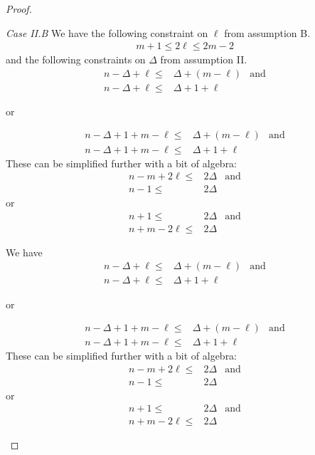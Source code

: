 \begin{proof}
\begin{description}
  \textit{Case II.B}  We have the following constraint on $\ell$ from
  assumption B.
  \begin{align*}
   m + 1 \leq 2 \ell \leq 2m - 2
  \end{align*}
  and the following constraints on $\Delta$ from assumption II.
  \begin{align*}
   n - \Delta + \ell \leq & \Delta + (m - \ell) & \text{and} \\
   n - \Delta + \ell \leq & \Delta + 1 + \ell
  \end{align*}
  \begin{center}or\end{center}
  \begin{align*}
   n - \Delta + 1 + m - \ell \leq & \Delta + (m - \ell) & \text{and} \\
   n - \Delta + 1 + m - \ell \leq & \Delta + 1 + \ell
  \end{align*}
  These can be simplified further with a bit of algebra:
  \begin{align*}
   n-m+2\ell \leq & 2 \Delta & \text{and} \\
   n-1 \leq       & 2\Delta
  \end{align*}
  or
  \begin{align*}
   n+1 \leq        & 2 \Delta & \text{and} \\
   n+m-2\ell  \leq & 2 \Delta
  \end{align*}

  We have
  \begin{align*}
   n - \Delta + \ell \leq & \Delta + (m - \ell) & \text{and} \\
   n - \Delta + \ell \leq & \Delta + 1 + \ell
  \end{align*}
  \begin{center}or\end{center}
  \begin{align*}
   n - \Delta + 1 + m - \ell \leq & \Delta + (m - \ell) & \text{and} \\
   n - \Delta + 1 + m - \ell \leq & \Delta + 1 + \ell
  \end{align*}
  These can be simplified further with a bit of algebra:
  \begin{align*}
   n-m+2\ell \leq & 2 \Delta & \text{and} \\
   n-1 \leq       & 2\Delta
  \end{align*}
  or
  \begin{align*}
   n+1 \leq        & 2 \Delta & \text{and} \\
   n+m-2\ell  \leq & 2 \Delta
  \end{align*}


\end{description}
\end{proof}
